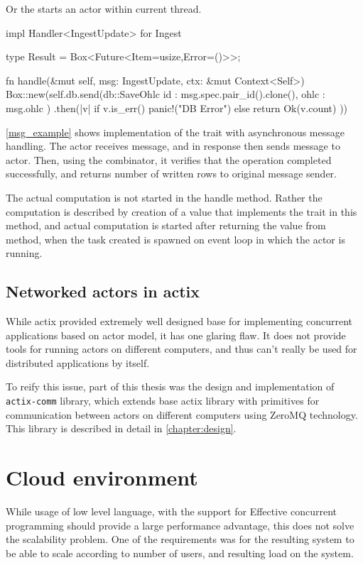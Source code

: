 Or the  starts an actor within current thread.

\begin{code}[language=rust,label={msg_example},caption={Asynchronous message handling example}]
    impl Handler<IngestUpdate> for Ingest {
        type Result = Box<Future<Item=usize,Error=()>>;

        fn handle(&mut self, msg: IngestUpdate, ctx: &mut Context<Self>) {
            Box::new(self.db.send(db::SaveOhlc{
                id : msg.spec.pair_id().clone(),
                ohlc : msg.ohlc
            })
            .then(|v| if v.is_err() { panic!("DB Error")} else { return Ok(v.count) }))
        }
    }
\end{code}

\autoref{msg_example} shows implementation of the  trait with asynchronous message handling. The  actor receives  message,
and in response then sends  message to  actor. Then, using the  combinator, it
verifies that the operation completed successfully, and returns number of written rows to original message sender.

The actual computation is not started in the handle method. Rather the computation is described by creation
of a value that implements the  trait in this method, and actual computation is started after returning
the value from  method, when the task created is spawned on event loop in which the actor is running.


\subsection{Networked actors in actix}
While actix provided extremely well designed base for implementing concurrent applications based on actor model, it has
one glaring flaw. It does not provide tools for running actors on different computers, and thus can't really be used for
distributed applications by itself.

To reify this issue, part of this thesis was the design and implementation of \verb|actix-comm| library, which extends
base actix library with primitives for communication between actors on different computers using ZeroMQ technology.
This library is described in detail in \autoref{chapter:design}.

\section{Cloud environment}
While usage of low level language, with the support for Effective concurrent programming should provide a large performance
advantage, this does not solve the scalability problem. One of the requirements was for the resulting system to
be able to scale according to number of users, and resulting load on the system.

